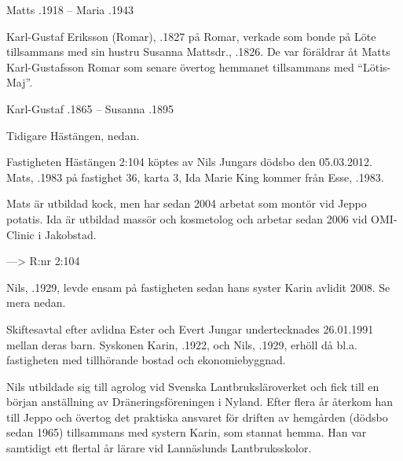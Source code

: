 Matts .1918  --  Maria .1943


Karl-Gustaf Eriksson (Romar), .1827 på Romar, verkade som bonde på Löte tillsammans med sin hustru Susanna Mattsdr., .1826. De var föräldrar åt Matts Karl-Gustafsson Romar som senare övertog hemmanet tillsammans med ``Lötis-Maj''.

Karl-Gustaf .1865  --  Susanna .1895



Tidigare Hästängen, nedan.




Fastigheten Hästängen 2:104 köptes av Nils Jungars dödsbo den 05.03.2012. Mats, .1983 på fastighet 36, karta 3, Ida Marie King kommer från Esse, .1983.

Mats är utbildad kock, men har sedan 2004 arbetat som montör vid Jeppo potatis. Ida är utbildad massör och kosmetolog och arbetar sedan 2006 vid OMI-Clinic i Jakobstad.
\begin{jhchildren}
  \item {}
  \item {}
  \item {}
\end{jhchildren}

--->  R:nr 2:104

Nils, .1929, levde ensam på fastigheten sedan hans syster Karin avlidit 2008. Se mera nedan.


Skiftesavtal efter avlidna Ester och Evert Jungar undertecknades 26.01.1991 mellan deras barn. Syskonen Karin, .1922, och Nils, .1929, erhöll då bl.a. fastigheten med tillhörande bostad och ekonomiebyggnad.

Nils utbildade sig till agrolog vid Svenska Lantbruksläroverket och fick till en början anställning av Dräneringsföreningen i Nyland. Efter flera år återkom han till Jeppo och övertog det praktiska ansvaret för driften av hemgården (dödsbo sedan 1965) tillsammans med systern Karin, som stannat hemma. Han var samtidigt ett flertal år lärare vid Lannäslunds Lantbruksskolor.

